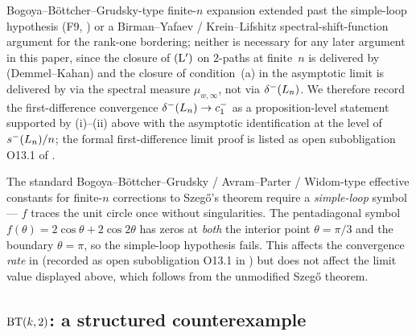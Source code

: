 \begin{remark}
\begin{enumerate}[label=(\roman*)]
Bogoya--B\"ottcher--Grudsky-type finite-$n$ expansion extended past
the simple-loop hypothesis (F9, ) or a
Birman--Yafaev / Krein--Lifshitz spectral-shift-function argument
\cite{BirmanYafaev1993} for the rank-one bordering; neither is
necessary for any later argument in this paper, since the closure of
$(\mathrm{L}')$ on $2$-paths at finite~$n$ is delivered by
 (Demmel--Kahan) and the closure of condition~(a)
in the asymptotic limit is delivered by 
via the spectral measure $\mu_{w, \infty}$, not via $\delta^{-}(L_{n})$.
We therefore record the first-difference convergence
$\delta^{-}(L_{n}) \to c_{1}^{-}$ as a proposition-level statement supported
by (i)--(ii) above with the asymptotic identification at
the level of $s^{-}(L_{n})/n$; the formal first-difference limit proof
is listed as open subobligation O13.1 of .
\end{enumerate}
\end{remark}

\begin{remark}\label{rem:simple-loop}
The standard Bogoya--B\"ottcher--Grudsky \cite{BBG2015} /
Avram--Parter \cite{AvramParter1988} / Widom-type effective constants
for finite-$n$ corrections to Szeg\H{o}'s theorem require a
\emph{simple-loop} symbol — $f$ traces the unit circle once without
singularities. The pentadiagonal symbol
$f(\theta) = 2\cos\theta + 2\cos 2\theta$ has zeros at \emph{both} the
interior point $\theta = \pi/3$ and the boundary $\theta = \pi$, so
the simple-loop hypothesis fails. This affects the convergence
\emph{rate} in  (recorded as open subobligation
O13.1 in ) but does not affect the limit value
displayed above, which follows from the unmodified Szeg\H{o} theorem.
\end{remark}

\subsection{$\mathrm{BT}(k,2)$: a structured counterexample}\label{sec:subfamily:BT}

